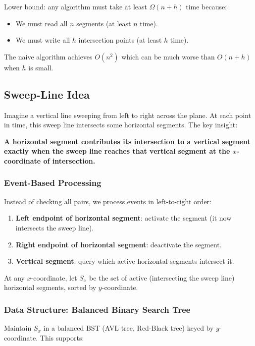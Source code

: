 \documentclass[11pt]{article}
\begin{document}
Lower bound: any algorithm must take at least $\Omega(n + h)$ time because:
\begin{itemize}
\item We must read all $n$ segments (at least $n$ time).
\item We must write all $h$ intersection points (at least $h$ time).
\end{itemize}

The naive algorithm achieves $O(n^2)$ which can be much worse than $O(n + h)$ when $h$ is small.

\subsection*{Sweep-Line Idea}

Imagine a vertical line sweeping from left to right across the plane. At each point in time, this sweep line intersects some horizontal segments. The key insight:

\textbf{A horizontal segment contributes its intersection to a vertical segment exactly when the sweep line reaches that vertical segment at the $x$-coordinate of intersection.}

\subsubsection*{Event-Based Processing}
Instead of checking all pairs, we process events in left-to-right order:

\begin{enumerate}
\item \textbf{Left endpoint of horizontal segment}: activate the segment (it now intersects the sweep line).
\item \textbf{Right endpoint of horizontal segment}: deactivate the segment.
\item \textbf{Vertical segment}: query which active horizontal segments intersect it.
\end{enumerate}

At any $x$-coordinate, let $S_x$ be the set of active (intersecting the sweep line) horizontal segments, sorted by $y$-coordinate.

\subsubsection*{Data Structure: Balanced Binary Search Tree}
Maintain $S_x$ in a balanced BST (AVL tree, Red-Black tree) keyed by $y$-coordinate. This supports:
\end{document}
